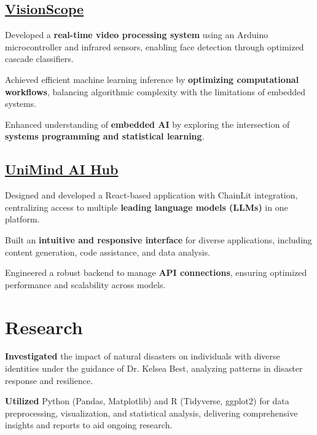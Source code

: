 \documentclass[]{deedy-resume-openfont}
\begin{document}
\begin{minipage}[t]{0.70\textwidth}
\subsection{\href{https://arduino.cc/}{VisionScope}}
\begin{tightemize}
\vspace{10pt}
\item Developed a \textbf{real-time video processing system} using an Arduino microcontroller and infrared sensors, enabling face detection through optimized cascade classifiers.
\item Achieved efficient machine learning inference by \textbf{optimizing computational workflows}, balancing algorithmic complexity with the limitations of embedded systems.
\item Enhanced understanding of \textbf{embedded AI} by exploring the intersection of \textbf{systems programming and statistical learning}.
\end{tightemize}
\sectionsep

\subsection{\href{https://yourapp.link}{UniMind AI Hub}}
\begin{tightemize}
\vspace{10pt}
\item Designed and developed a React-based application with ChainLit integration, centralizing access to multiple \textbf{leading language models (LLMs)} in one platform.
\item Built an \textbf{intuitive and responsive interface} for diverse applications, including content generation, code assistance, and data analysis.
\item Engineered a robust backend to manage \textbf{API connections}, ensuring optimized performance and scalability across models.
\end{tightemize}
\section{Research}

\begin{tightemize}
\vspace{10pt}
\item \textbf{Investigated} the impact of natural disasters on individuals with diverse identities under the guidance of Dr. Kelsea Best, analyzing patterns in disaster response and resilience.
\item \textbf{Utilized} Python (Pandas, Matplotlib) and R (Tidyverse, ggplot2) for data preprocessing, visualization, and statistical analysis, delivering comprehensive insights and reports to aid ongoing research.
\end{tightemize}
\end{minipage} 
\end{document}
